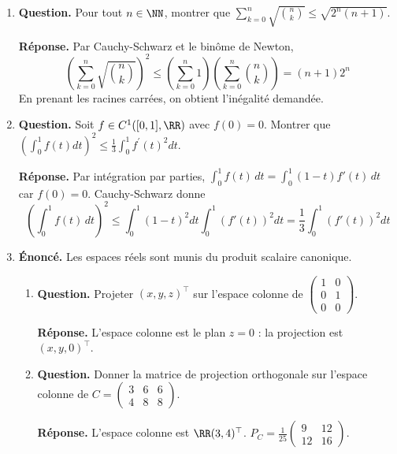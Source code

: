\documentclass[12pt, a4paper]{article}
\begin{document}
\begin{enumerate}[label=8.\arabic*., start=70]
\begin{minipage}[t]{\linewidth}
\begin{enumerate}[\arabic*.]
\end{enumerate}
\end{minipage}

  \item \begin{minipage}[t]{\linewidth}\raggedright
\textbf{Question.} Pour tout $n\in\NN$, montrer que $\sum_{k=0}^n\sqrt{\binom nk}\leq\sqrt{2^n(n+1)}$.
\par\smallskip
\textbf{Réponse.} Par Cauchy-Schwarz et le binôme de Newton,
    \[
      \left(\sum_{k=0}^n\sqrt{\binom nk}\right)^2
      \leq\left(\sum_{k=0}^n1\right)\left(\sum_{k=0}^n\binom nk\right)=(n+1)2^n
    \]
    En prenant les racines carrées, on obtient l'inégalité demandée.
\end{minipage}

  \item \begin{minipage}[t]{\linewidth}\raggedright
\textbf{Question.} Soit $f\in C^1([0,1],\RR)$ avec $f(0)=0$. Montrer que $(\int_0^1f(t)dt)^2\leq\frac13\int_0^1f^{\prime}(t)^2dt$.
\par\smallskip
\textbf{Réponse.} Par intégration par parties, $\int_0^1f(t)\,dt=\int_0^1(1-t)f'(t)\,dt$ car $f(0)=0$.
    Cauchy-Schwarz donne
    \[
      \left(\int_0^1f(t)\,dt\right)^2
      \leq\int_0^1(1-t)^2dt\int_0^1(f'(t))^2dt
      =\frac13\int_0^1(f'(t))^2dt
    \]
\end{minipage}

  \item \begin{minipage}[t]{\linewidth}\raggedright
\textbf{Énoncé.} Les espaces réels sont munis du produit scalaire canonique.

\begin{enumerate}[\arabic*.]
        \item \textbf{Question.} Projeter $(x,y,z)^\top$ sur l’espace colonne de $\begin{pmatrix}1&0\\0&1\\0&0\end{pmatrix}$.
\par\smallskip
\textbf{Réponse.} L'espace colonne est le plan $z=0$ : la projection est $(x,y,0)^\top$.

  \item \textbf{Question.} Donner la matrice de projection orthogonale sur l’espace colonne de $C=\begin{pmatrix}3&6&6\\4&8&8\end{pmatrix}$.
\par\smallskip
\textbf{Réponse.} L'espace colonne est $\RR(3,4)^\top$.
        $\displaystyle P_C=\frac1{25}\begin{pmatrix}9&12\\12&16\end{pmatrix}$.


\end{enumerate}
\end{minipage}
\end{enumerate}
\end{document}
